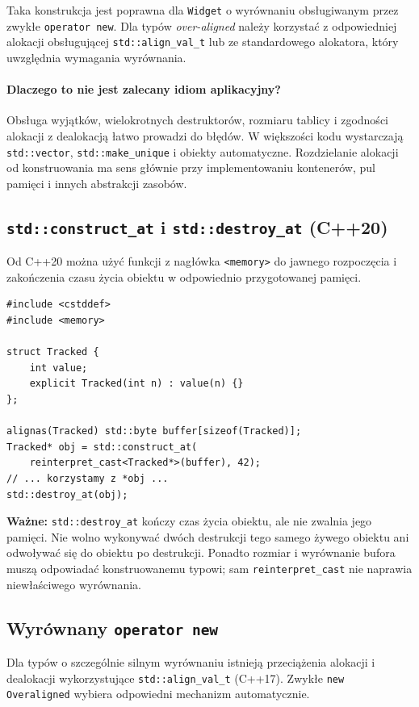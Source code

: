 Taka konstrukcja jest poprawna dla \texttt{Widget} o wyrównaniu
obsługiwanym przez zwykłe \texttt{operator new}. Dla typów
\emph{over-aligned} należy korzystać z odpowiedniej alokacji
obsługującej \texttt{std::align\_val\_t} lub ze standardowego
alokatora, który uwzględnia wymagania wyrównania.

\paragraph{Dlaczego to nie jest zalecany idiom aplikacyjny?}
Obsługa wyjątków, wielokrotnych destruktorów, rozmiaru tablicy
i zgodności alokacji z dealokacją łatwo prowadzi do błędów.
W większości kodu wystarczają \texttt{std::vector},
\texttt{std::make\_unique} i obiekty automatyczne. Rozdzielanie
alokacji od konstruowania ma sens głównie przy implementowaniu
kontenerów, pul pamięci i innych abstrakcji zasobów.

\subsection{\texttt{std::construct\_at} i \texttt{std::destroy\_at} (C++20)}

Od C++20 można użyć funkcji z nagłówka \texttt{<memory>} do
jawnego rozpoczęcia i zakończenia czasu życia obiektu w odpowiednio
przygotowanej pamięci.

\begin{lstlisting}
#include <cstddef>
#include <memory>

struct Tracked {
    int value;
    explicit Tracked(int n) : value(n) {}
};

alignas(Tracked) std::byte buffer[sizeof(Tracked)];
Tracked* obj = std::construct_at(
    reinterpret_cast<Tracked*>(buffer), 42);
// ... korzystamy z *obj ...
std::destroy_at(obj);
\end{lstlisting}

\textbf{Ważne:} \texttt{std::destroy\_at} kończy czas życia obiektu, ale
nie zwalnia jego pamięci. Nie wolno wykonywać dwóch destrukcji tego
samego żywego obiektu ani odwoływać się do obiektu po destrukcji.
Ponadto rozmiar i wyrównanie bufora muszą odpowiadać konstruowanemu
typowi; sam \texttt{reinterpret\_cast} nie naprawia niewłaściwego
wyrównania.

\subsection{Wyrównany \texttt{operator new}}

Dla typów o szczególnie silnym wyrównaniu istnieją przeciążenia
alokacji i dealokacji wykorzystujące \texttt{std::align\_val\_t}
(C++17). Zwykłe \texttt{new Overaligned{}} wybiera odpowiedni
mechanizm automatycznie.

